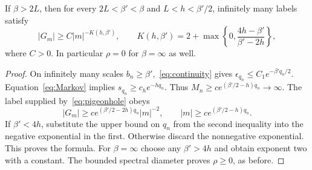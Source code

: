 \begin{theorem}\label{thm:measure}
If $\beta>2L$, then for every $2L<\beta'<\beta$ and $L<h<\beta'/2$, infinitely many labels satisfy
\[
 |G_m|\ge C|m|^{-K(h,\beta')},\qquad
 K(h,\beta')=2+\max\left\{0,\frac{4h-\beta'}{\beta'-2h}\right\},
\]
where $C>0$. In particular $\rho=0$ for $\beta=\infty$ as well.
\end{theorem}
\begin{proof}
On infinitely many scales $b_n\ge\beta'$,~\eqref{eq:continuity} gives $\epsilon_{q_n}\le C_1e^{-\beta'q_n/2}$. Equation~\eqref{eq:Markov} implies $s_{q_n}\ge c_he^{-hq_n}$. Thus $M_n\ge c e^{(\beta'/2-h)q_n}\to\infty$. The label supplied by~\eqref{eq:pigeonhole} obeys
\[
 |G_m|\ge c e^{(\beta'/2-2h)q_n}|m|^{-2},
 \qquad |m|\ge c e^{(\beta'/2-h)q_n}.
\]
If $\beta'<4h$, substitute the upper bound on $q_n$ from the second inequality into the negative exponential in the first. Otherwise discard the nonnegative exponential. This proves the formula. For $\beta=\infty$ choose any $\beta'>4h$ and obtain exponent two with a constant. The bounded spectral diameter proves $\rho\ge0$, as before.
\end{proof}

